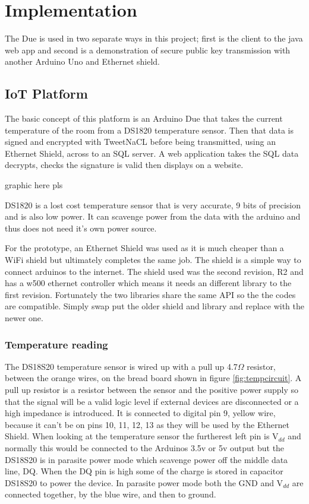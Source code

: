 
\chapter{Implementation}
\label{imple}


The Due is used in two separate ways in this project; first is the client to the java web app and second is a demonstration of secure public key transmission with another Arduino Uno and Ethernet shield. 

\section{IoT Platform}

The basic concept of this platform is an Arduino Due that takes the current temperature of the room from a DS1820 temperature sensor. Then that data is signed and encrypted with TweetNaCL before being transmitted, using an Ethernet Shield, across to an SQL server. A web application takes the SQL data decrypts, checks the signature is valid then displays on a website. 

graphic here pls


DS1820 is a lost cost temperature sensor that is very accurate, 9 bits of precision and is also low power. It can scavenge power from the data with the arduino and thus does not need it's own power source. 

For the prototype, an Ethernet Shield was used as it is much cheaper than a WiFi shield but ultimately completes the same job. The shield is a simple way to connect arduinos to the internet. The shield used was the second revision, R2 and has a w500 ethernet controller which means it needs an different library to the first revision. Fortunately the two libraries share the same API so the the codes are compatible. Simply swap put the older shield and library and replace with the newer one.


\subsection{Temperature reading}

The DS18S20 temperature sensor is wired up with a pull up 4.7$\Omega$ resistor, between the orange wires, on the bread board shown in figure \ref{fig:tempcircuit}. A pull up resistor is a resistor between the sensor and the positive power supply so that the signal will be a valid logic level if external devices are disconnected or a high impedance is introduced. It is connected to digital pin 9, yellow wire, because it can't be on pins 10, 11, 12, 13 as they will be used by the Ethernet Shield. When looking at the temperature sensor the furtherest left pin is V$_{dd}$ and normally this would be connected to the Arduinos 3.5v or 5v output but the DS18S20 is in parasite power mode which scavenge power off the middle data line, DQ. When the DQ pin is high some of the charge is stored in capacitor DS18S20 to power the device. In parasite power mode both the GND and V$_{dd}$ are connected together, by the blue wire, and then to ground.

